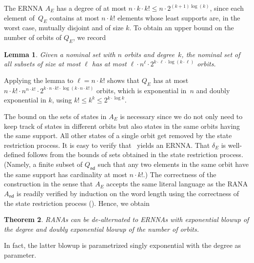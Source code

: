 \documentclass[10pt,a4paper]{amsart}
\newtheorem{theo}{Theorem}[section]
\newtheorem{lem}[theo]{Lemma}
\theoremstyle{definition}
\newcommand{\op}[1]{\operatorname{\mathsf{#1}}}
\newcommand{\nd}{\op{nd}}
\begin{document}
\noindent The ERNNA $A_E$ has a degree of at most $n \cdot k \cdot k! \leqslant
n \cdot 2^{(k + 1)\log(k)}$, since each element of~$Q_E$ contains at
most $n \cdot k!$ elements whose least supports are, in the worst
case, mutually disjoint and of size $k$.
To obtain an upper bound on the number of orbits of $Q_E$, we record %
\begin{lem}\label{L:Bell}
  Given a nominal set with $n$ orbits and degree~$k$, the nominal set of all subsets of size at most $\ell$ has at most $\ell \cdot n^\ell \cdot 2^{k\cdot \ell \cdot \log(k \cdot\ell)}$ orbits.
\end{lem}

Applying the lemma to $\ell = n \cdot k!$ shows that $Q_E$ has at most
$
  n \cdot k! \cdot  n^{n \cdot k!} \cdot 2^{k \cdot n \cdot k! \cdot\log(k \cdot n \cdot k!)}$ orbits, which is exponential in~$n$ and doubly exponential in $k$, using $k! \leqslant k^k \leqslant 2^{k\cdot \log k}$.

  The bound on the sets of states in $A_E$ is necessary since we do not only need to keep track
  of states in different orbits but also states in the same orbits having the same support.
  All other states of a single orbit get removed by the state restriction process.  It is easy
  to verify that~ yields an ERNNA.  That $\delta_E$ is well-defined follows
  from the bounds of sets obtained in the state restriction process.  (Namely, a finite subset
  of $Q_{\nd}$ such that any two elements in the same orbit have the same support has
  cardinality at most $n\cdot k!$.)  The correctness of the construction in the sense that
  $A_E$ accepts the same literal language as the RANA $A_{\nd}$ is readily verified by
  induction on the word length using the correctness of the state restriction process
  (). Hence, we obtain



\begin{theo}\label{thm:corrdealt}
  RANAs can be de-alternated to ERNNAs with exponential blowup of the degree
  and doubly exponential blowup of the number of orbits.
\end{theo}


\noindent In fact, the latter blowup is parametrized singly exponential with the
degree as parameter.
\end{document}

